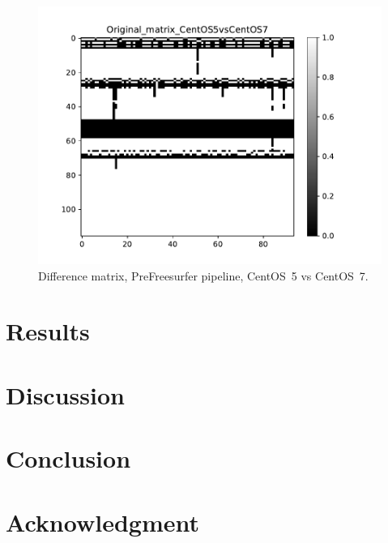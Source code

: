\documentclass[10pt, conference, compsocconf]{IEEEtran}
\begin{document}
\begin{figure}
  \includegraphics[width=\columnwidth]{figures/original_matrix_CentOS5vsCentOS7.pdf}
  \caption{Difference matrix, PreFreesurfer pipeline, CentOS~5 vs CentOS~7.}
  \label{fig:pre-freesurfer-5-7}
\end{figure}



\section{Results}



\section{Discussion}






\section{Conclusion}


\section*{Acknowledgment}



\end{document}
